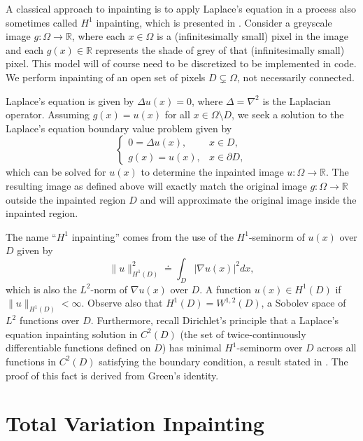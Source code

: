 \documentclass[11pt,reqno,twoside]{amsart}
\theoremstyle{plain}
\theoremstyle{definition}
\numberwithin{figure}{section}
\numberwithin{equation}{section}
\begin{document}
A classical approach to inpainting is to apply Laplace's equation in a process also sometimes called $H^1$ inpainting, which is presented in \cite{ge2012}.  Consider a greyscale image $g: \Omega \to \mathbb{R}$, where each $x \in \Omega$ is a (infinitesimally small) pixel in the image and each $g(x) \in \mathbb{R}$ represents the shade of grey of that (infinitesimally small) pixel.  This model will of course need to be discretized to be implemented in code.  We perform inpainting of an open set of pixels $D \subsetneq \Omega$, not necessarily connected.  

Laplace's equation is given by $\Delta u(x) = 0$, where $\Delta = \nabla^2$ is the Laplacian operator.  Assuming $g(x) = u(x)$ for all $x \in \Omega \setminus D$, we seek a solution to the Laplace's equation boundary value problem given by
\begin{equation*}
\begin{cases}
0= \Delta u(x), & x \in D, \\ 
g(x) = u(x), & x \in \partial D,
\end{cases}
\end{equation*}
which can be solved for $u(x)$ to determine the inpainted image $u: \Omega \to \mathbb{R}$.  The resulting image as defined above will exactly match the original image $g: \Omega \to \mathbb{R}$ outside the inpainted region $D$ and will approximate the original image inside the inpainted region.

The name ``$H^1$ inpainting'' comes from the use of the $H^1$-seminorm of $u(x)$ over $D$ given by
\begin{equation*}
\|u\|_{H^1(D)}^2 \doteq \int_D |\nabla u(x)|^2 dx,
\end{equation*}
which is also the $L^2$-norm of $\nabla u(x)$ over $D$.  A function $u(x) \in H^1(D)$ if $\|u\|_{H^1(D)} < \infty$.  Observe also that $H^1(D) = W^{1,2}(D)$, a Sobolev space of $L^2$ functions over $D$.  Furthermore, recall Dirichlet's principle that a Laplace's equation inpainting solution in $C^2(D)$ (the set of twice-continuously differentiable functions defined on $D$) has minimal $H^1$-seminorm over $D$ across all functions in $C^2(D)$ satisfying the boundary condition, a result stated in \cite{ev1998}.  The proof of this fact is derived from Green's identity.

\newpage 

\section{Total Variation Inpainting}
\end{document}
